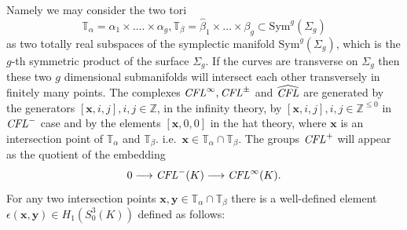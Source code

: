 \documentclass{gtart_h}
\theoremstyle{definition}
\newcommand\x{\mathbf x}
\newcommand\y{\mathbf y}
\newcommand\CFL{\text{\it CFL\/}}
\newcommand\Sym{\mathrm{Sym}}
\begin{document}
Namely we may consider the two tori
$$\mathbb{T}_\alpha=\alpha_1\times \ldots.\times \alpha_g,
\mathbb{T}_\beta=\hat \beta_1 \times \ldots\times \beta_g \subset \Sym^g (\Sigma_g)$$
as two totally real subspaces of the symplectic manifold $\Sym^g (\Sigma_g)$, which
is the $g$-th symmetric product of the surface $\Sigma_g$. If the curves are transverse
on $\Sigma_g$ then these two $g$ dimensional submanifolds will intersect each other
transversely in finitely many points. The complexes $\CFL^\infty, \CFL^{\pm}$ and
$\widehat{\CFL}$ are generated
by the generators $[\x,i,j], i,j\in \mathbb{Z}$, in the infinity
theory, by $[\x,i,j], i,j\in \mathbb{Z}^{\leq 0}$ in $\CFL^-$ case and by the elements
$[\x,0,0]$ in the hat theory, where $\x$ is an intersection point of
$\mathbb{T}_\alpha$ and $ \mathbb{T}_\beta$. i.e.\
$\x\in \mathbb{T}_\alpha \cap \mathbb{T}_\beta$. The groups $\CFL^+$ will appear as the
quotient of the embedding
$$
0\longrightarrow \CFL^-(K) \longrightarrow \CFL^\infty(K).$$
For any two intersection points $\x,\y \in \mathbb{T}_\alpha \cap \mathbb{T}_\beta$
there is a well-defined element $\epsilon (\x,\y) \in H_1(S^3_0(K))$ defined as follows:
\end{document}
